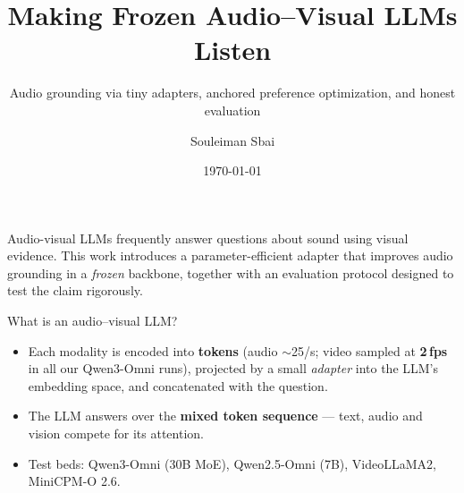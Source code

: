 \documentclass[aspectratio=169,11pt]{beamer}
\title{\textbf{Making Frozen Audio--Visual LLMs Listen}}
\subtitle{Audio grounding via tiny adapters, anchored preference optimization, and honest evaluation}
\author{Souleiman Sbai}
\institute{Research internship --- final presentation\\[2pt]
  \footnotesize Host lab: AIST CVRT \quad$\cdot$\quad Supervisor: Qiu Yue}
\date{\today}
\begin{document}
{
\begin{frame}
\titlepage
\vspace{-1.2em}
\begin{block}{}
\footnotesize Audio-visual LLMs frequently answer questions about sound using visual evidence. This work
introduces a parameter-efficient adapter that improves audio grounding in a \emph{frozen} backbone,
together with an evaluation protocol designed to test the claim rigorously.
\end{block}
\end{frame}}


\begin{frame}{What is an audio--visual LLM?}
\centering
{}
\vspace{0.5em}
\begin{itemize}\footnotesize
\item Each modality is encoded into \textbf{tokens} (audio $\sim$25/s; video sampled at
\textbf{2\,fps} in all our Qwen3-Omni runs), projected by a small \emph{adapter} into the LLM's
embedding space, and concatenated with the question.
\item The LLM answers over the \textbf{mixed token sequence} --- text, audio and vision compete
for its attention.
\item Test beds: Qwen3-Omni (30B MoE), Qwen2.5-Omni (7B), VideoLLaMA2, MiniCPM-O 2.6.
\end{itemize}
\end{frame}
\end{document}
